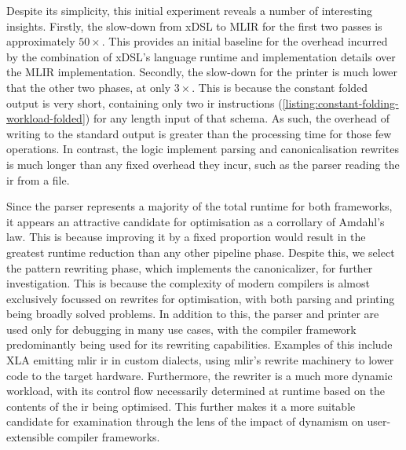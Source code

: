Despite its simplicity, this initial experiment reveals a number of interesting insights.
Firstly, the slow-down from xDSL to MLIR for the first two passes is approximately $50\times$. This provides an initial baseline for the overhead incurred by the combination of xDSL's language runtime and implementation details over the MLIR implementation.
Secondly, the slow-down for the printer is much lower that the other two phases, at only $3\times$. %
This is because the constant folded output is very short, containing only two \ac{ir} instructions (\autoref{listing:constant-folding-workload-folded}) for any length input of that schema. As such, the overhead of writing to the standard output is greater than the processing time for those few operations. In contrast, the logic implement parsing and canonicalisation rewrites is much longer than any fixed overhead they incur, such as the parser reading the \ac{ir} from a file.

Since the parser represents a majority of the total runtime for both frameworks, it appears an attractive candidate for optimisation as a corrollary of Amdahl's law. This is because improving it by a fixed proportion would result in the greatest runtime reduction than any other pipeline phase.
Despite this, we select the pattern rewriting phase, which implements the canonicalizer, for further investigation.
This is because the complexity of modern compilers is almost exclusively focussed on rewrites for optimisation, with both parsing and printing being broadly solved problems. In addition to this, the parser and printer are used only for debugging in many use cases, with the compiler framework predominantly being used for its rewriting capabilities. Examples of this include XLA \cite{sabne2020xla} emitting \ac{mlir} \ac{ir} in custom dialects, using \ac{mlir}'s rewrite machinery to lower code to the target hardware.
Furthermore, the rewriter is a much more dynamic workload, with its control flow necessarily determined at runtime based on the contents of the \ac{ir} being optimised.
This further makes it a more suitable candidate for examination through the lens of the impact of dynamism on user-extensible compiler frameworks.








